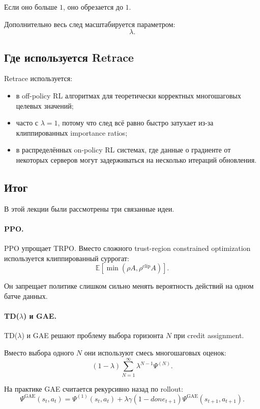 \documentclass[12pt,a4paper]{article}
\begin{document}
Если оно больше $1$, оно обрезается до $1$.

Дополнительно весь след масштабируется параметром:
\[
\lambda.
\]

\subsection{Где используется Retrace}

Retrace используется:

\begin{itemize}
    \item в off-policy RL алгоритмах для теоретически корректных многошаговых целевых значений;
    \item часто с $\lambda=1$, потому что след всё равно быстро затухает из-за клиппированных importance ratios;
    \item в распределённых on-policy RL системах, где данные о градиенте от некоторых серверов могут задерживаться на несколько итераций обновления.
\end{itemize}

\subsection{Итог}

В этой лекции были рассмотрены три связанные идеи.

\paragraph{PPO.}

PPO упрощает TRPO. Вместо сложного trust-region constrained optimization используется клиппированный суррогат:
\[
\mathbb E
\left[
\min
\left(
\rho A,
\rho^{\mathrm{clip}}A
\right)
\right].
\]

Он запрещает политике слишком сильно менять вероятность действий на одном батче данных.

\paragraph{TD($\lambda$) и GAE.}

TD($\lambda$) и GAE решают проблему выбора горизонта $N$ при credit assignment.

Вместо выбора одного $N$ они используют смесь многошаговых оценок:
\[
(1-\lambda)
\sum_{N=1}^{\infty}
\lambda^{N-1}
\Psi^{(N)}.
\]

На практике GAE считается рекурсивно назад по rollout:
\[
\Psi^{\mathrm{GAE}}(s_t,a_t)
=
\Psi^{(1)}(s_t,a_t)
+
\lambda\gamma(1-done_{t+1})
\Psi^{\mathrm{GAE}}(s_{t+1},a_{t+1}).
\]
\end{document}
